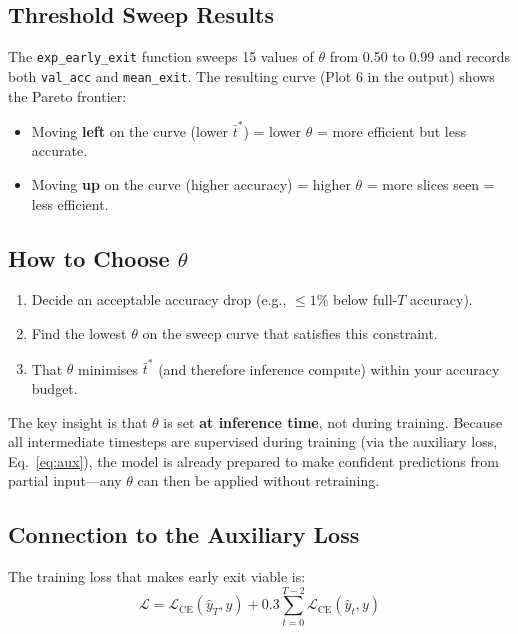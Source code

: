 \documentclass[11pt,a4paper]{article}
\begin{document}
\subsection{Threshold Sweep Results}

The \texttt{exp\_early\_exit} function sweeps 15 values of $\theta$ from 0.50
to 0.99 and records both \texttt{val\_acc} and \texttt{mean\_exit}. The resulting
curve (Plot 6 in the output) shows the Pareto frontier:

\begin{itemize}
  \item Moving \textbf{left} on the curve (lower $\bar{t}^*$) = lower $\theta$
        = more efficient but less accurate.
  \item Moving \textbf{up} on the curve (higher accuracy) = higher $\theta$
        = more slices seen = less efficient.
\end{itemize}

\subsection{How to Choose $\theta$}

\begin{enumerate}
  \item Decide an acceptable accuracy drop (e.g., $\le 1\%$ below full-$T$ accuracy).
  \item Find the lowest $\theta$ on the sweep curve that satisfies this constraint.
  \item That $\theta$ minimises $\bar{t}^*$ (and therefore inference compute)
        within your accuracy budget.
\end{enumerate}

The key insight is that $\theta$ is set \textbf{at inference time}, not during
training. Because all intermediate timesteps are supervised during training
(via the auxiliary loss, Eq.~\ref{eq:aux}), the model is already prepared to
make confident predictions from partial input---any $\theta$ can then be applied
without retraining.

\subsection{Connection to the Auxiliary Loss}
\label{sec:aux}

The training loss that makes early exit viable is:
\begin{equation}
  \mathcal{L} = \mathcal{L}_{\text{CE}}(\hat{y}_T, y)
              + 0.3 \sum_{t=0}^{T-2} \mathcal{L}_{\text{CE}}(\hat{y}_t, y)
  \label{eq:aux}
\end{equation}
\end{document}
